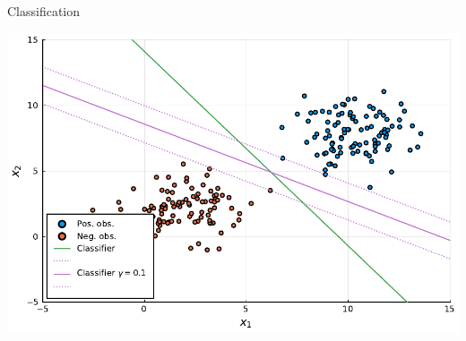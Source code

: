 \begin{frame}{Classification}

	\centering
	\includegraphics[width = \textwidth]{Figures/classes_with_robust_classifier.pdf}

\end{frame}
